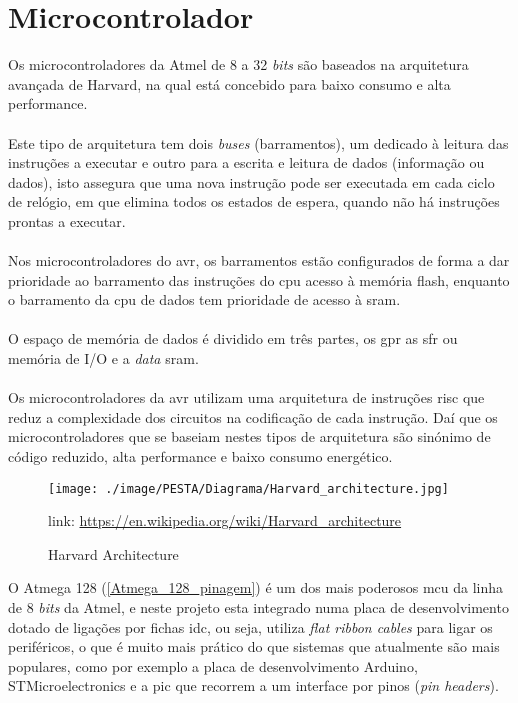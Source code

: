 \section{Microcontrolador}
Os microcontroladores da Atmel de 8 a 32 \textit{bits} são baseados na arquitetura avançada de Harvard, na qual está concebido para baixo consumo e alta performance.
\\
\\
Este tipo de arquitetura tem dois \textit{buses} (barramentos), um dedicado à leitura das instruções a executar e outro para a escrita e leitura de dados (informação ou dados), isto assegura que uma nova instrução pode ser executada em cada ciclo de relógio, em que elimina todos os estados de espera, quando não há instruções prontas a executar.
\\
\\
Nos microcontroladores do \ac{avr}, os barramentos estão configurados de forma a dar prioridade ao barramento das instruções do \ac{cpu} acesso à memória flash, enquanto o barramento da \acs{cpu} de dados tem prioridade de acesso à \ac{sram}.
\\
\\
O espaço de memória de dados é dividido em três partes, os \ac{gpr} as \ac{sfr} ou memória de I/O e a \textit{data} \acs{sram}.
\\
\\
Os microcontroladores da \acs{avr} utilizam uma arquitetura de instruções \ac{risc} que reduz a complexidade dos circuitos na codificação de cada instrução. Daí que os microcontroladores que se baseiam nestes tipos de arquitetura são sinónimo de código reduzido, alta performance e baixo consumo energético.
\\
\begin{figure}[H]
	\centering
	\texttt{[image: ./image/PESTA/Diagrama/Harvard\_architecture.jpg]}
	\caption{Harvard Architecture}
	\label{Harvard_architecture}
	\vspace{.1cm}
	\qquad link: \url{https://en.wikipedia.org/wiki/Harvard_architecture}
\end{figure}
O Atmega 128 (\autoref{Atmega_128_pinagem}) é um dos mais poderosos \ac{mcu} da linha de 8 \textit{bits} da Atmel, e neste projeto esta integrado numa placa de desenvolvimento dotado de ligações por fichas \ac{idc}, ou seja, utiliza \textit{flat ribbon cables} para ligar os periféricos, o que é muito mais prático do que sistemas que atualmente são mais populares, como por exemplo a placa de desenvolvimento Arduino, STMicroelectronics e a \ac{pic} que recorrem a um interface por pinos (\textit{pin headers}).
